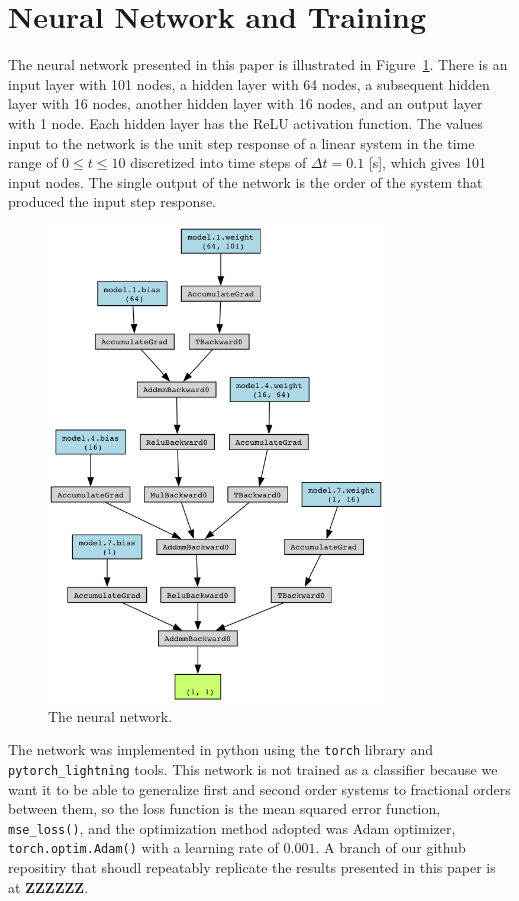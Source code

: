 \section{Neural Network and Training}

  The neural network presented in this paper is illustrated in
  Figure~\ref{fig:thennet}. There is an input layer with 101 nodes, a hidden
  layer with 64 nodes, a subsequent hidden layer with 16 nodes, another hidden
  layer with 16 nodes, and an output layer with 1 node. Each hidden layer has
  the ReLU activation function. The values input to the network is the unit step
  response of a linear system in the time range of $0 \leq t \leq 10$
  discretized into time steps of $\Delta t = 0.1$ [s], which gives 101 input
  nodes. The single output of the network is the order of the system that
  produced the input step response. 

  \begin{figure}
  \centering
  \includegraphics[width=3.5in]{viz.png}
  \caption{The neural network.}
  \label{fig:thennet}
  \end{figure}

  The network was implemented in python using the \texttt{torch} library and
  \texttt{pytorch\_lightning} tools. This network is not trained as a classifier
  because we want it to be able to generalize first and second order systems to
  fractional orders between them, so the loss function is the mean squared error
  function, \texttt{mse\_loss()}, and the optimization method adopted was Adam
  optimizer, \texttt{torch.optim.Adam()} with a learning rate of $0.001$. A
  branch of our github repositiry that shoudl repeatably replicate the results
  presented in this paper is at \textbf{ZZZZZZ}.

